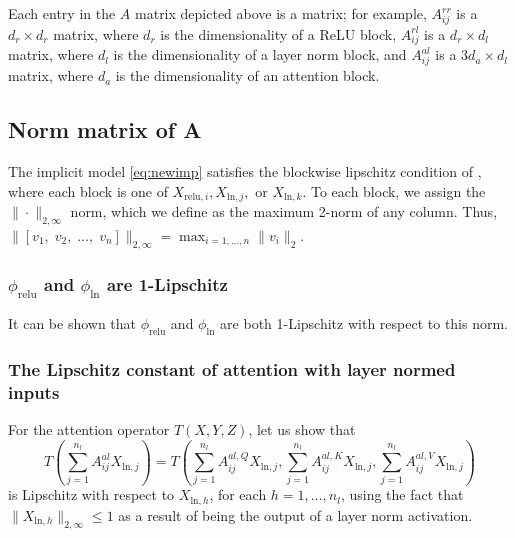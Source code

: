 \documentclass{article}
\begin{document}
Each entry in the $A$ matrix depicted above is a matrix; for example, $A^{rr}_{ij}$ is a $d_r\times d_r$ matrix, where 
$d_r$ is the dimensionality of a ReLU block, $A^{rl}_{ij}$ is a $d_r\times d_l$ matrix, where $d_l$ is the 
dimensionality of a layer norm block, and $A^{al}_{ij}$ is a $3d_a\times d_l$ matrix, where $d_a$ is the dimensionality
of an attention block.
\subsection{Norm matrix of \texorpdfstring{A}{}}
The implicit model \eqref{eq:newimp} satisfies the blockwise lipschitz condition of \citep{idl2019}, where each block is
one of $X_{\text{relu}, i}, X_{\text{ln},j},$ or $X_{\text{ln}, k}$. To each block, we assign the $\|\cdot\|_{2,\infty}$ 
norm, which we define as the maximum 2-norm of any column. Thus, $\|[v_1,\; v_2,\;\ldots,\;v_n]\|_{2,\infty} = 
\max_{i=1,\ldots,n}\|v_i\|_2$.

\subsubsection{\texorpdfstring{$\phi_\text{relu}$}{} and \texorpdfstring{$\phi_\text{ln}$}{} are 1-Lipschitz}
It can be shown that $\phi_\text{relu}$ and $\phi_\text{ln}$ are both 1-Lipschitz with respect to this norm. 
\subsubsection{The Lipschitz constant of attention with layer normed inputs}
For the attention operator $T(X, Y, Z)$, let us show that 
\begin{equation*}
  T\left(\sum_{j=1}^{n_l} A^{al}_{ij} X_{\text{ln}, j}\right) = T\left(\sum_{j=1}^{n_l} A^{al, Q}_{ij} X_{\text{ln}, j},
  \sum_{j=1}^{n_l} A^{al, K}_{ij} X_{\text{ln}, j}, \sum_{j=1}^{n_l} A^{al, V}_{ij} X_{\text{ln}, j}\right)
\end{equation*}
is Lipschitz with respect to $X_{\text{ln}, h}$, for each $h=1,\ldots, n_l$,
using the fact that $\|X_{\text{ln}, h}\|_{2,\infty} \leq 1$ as a result of 
being the output of a layer norm activation.
\end{document}
